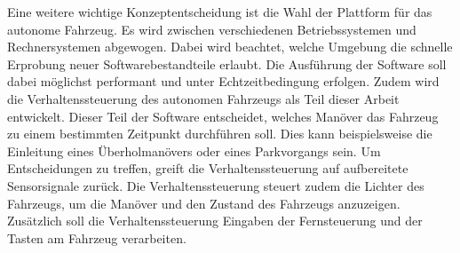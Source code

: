 Eine weitere wichtige Konzeptentscheidung ist die Wahl der Plattform für das autonome Fahrzeug. Es wird zwischen verschiedenen Betriebssystemen und Rechnersystemen abgewogen. Dabei wird beachtet, welche Umgebung die schnelle Erprobung neuer Softwarebestandteile erlaubt. Die Ausführung der Software soll dabei möglichst performant und unter Echtzeitbedingung erfolgen. Zudem wird die Verhaltenssteuerung des autonomen Fahrzeugs als Teil dieser Arbeit entwickelt. Dieser Teil der Software entscheidet, welches Manöver das Fahrzeug zu einem bestimmten Zeitpunkt durchführen soll. Dies kann beispielsweise die Einleitung eines Überholmanövers oder eines Parkvorgangs sein. Um Entscheidungen zu treffen, greift die Verhaltenssteuerung auf aufbereitete Sensorsignale zurück. Die Verhaltenssteuerung steuert zudem die Lichter des Fahrzeugs, um die Manöver und den Zustand des Fahrzeugs anzuzeigen. Zusätzlich soll die Verhaltenssteuerung Eingaben der Fernsteuerung und der Tasten am Fahrzeug verarbeiten. 
